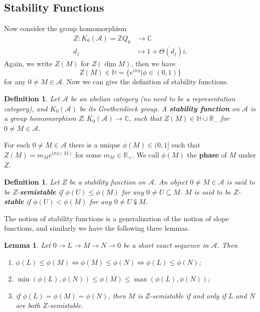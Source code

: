 \documentclass[a4paper,12pt]{amsart}
\newtheorem{definition}[theorem]{Definition}
\newtheorem{lemma}[theorem]{Lemma}
\newcommand{\udv}{\underline{\dim}}
\begin{document}
\subsection{Stability Functions}
Now consider the group homomorphism
\begin{align*}
    Z:K_0(\mathcal{A})=\mathbb{Z}Q_0&\rightarrow\mathbb{C}\\
    d_j&\mapsto1+\Theta(d_j)i.
\end{align*}
Again, we write $Z(M)$ for $Z(\udv M)$, then we have
\[Z(M)\in\mathbb{H}=\{e^{i\pi\phi}|\phi\in (0,1)\}\]
for any $0\neq M\in\mathcal{A}$. Now we can give the definition of stability functions.
\begin{definition}
    Let $\mathcal{A}$ be an abelian category (no need to be a representation category), and $K_0(\mathcal{A})$ be its Grothendieck group. A \textbf{stability function} on $\mathcal{A}$ is a group homomorphism $Z:K_0(\mathcal{A})\rightarrow\mathbb{C}$, such that $Z(M)\in\mathbb{H}\cup\mathbb{R}_-$ for $0\neq M\in\mathcal{A}$.
\end{definition}
    For each $0\neq M\in\mathcal{A}$ there is a unique $\phi(M)\in(0,1]$ such that $Z(M)=m_Me^{i\pi\phi(M)}$ for some $m_M\in\mathbb{R}_+$. We call $\phi(M)$ the \textbf{phase} of $M$ under $Z$.
\begin{definition}
    Let $Z$ be a stability function on $\mathcal{A}$. An object $0\neq M\in\mathcal{A}$ is said to be $Z$-\textbf{semistable} if $\phi(U)\leqslant\phi(M)$ for any $0\neq U\subseteq M$. $M$ is said to be $Z$-\textbf{stable} if $\phi(U)<\phi(M)$ for any $0\neq U\subsetneqq M$.
\end{definition}
The notion of stability functions is a generalization of the notion of slope functions, and similarly we have the following three lemmas.
\begin{lemma}\label{phase in ses}
    Let $0\rightarrow L\rightarrow M\rightarrow N\rightarrow 0$ be a short exact sequence in $\mathcal{A}$. Then
    \begin{enumerate}
        \item $\phi(L)\leqslant\phi(M)\iff\phi(M)\leqslant\phi(N)\iff\phi(L)\leqslant\phi(N)$;
        \item $\min(\phi(L),\phi(N))\leqslant\phi(M)\leqslant\max(\phi(L),\phi(N))$;
        \item if $\phi(L)=\phi(M)=\phi(N)$, then $M$ is $Z$-semistable if and only if $L$ and $N$ are both $Z$-semistable.
    \end{enumerate}
\end{lemma}
\end{document}
